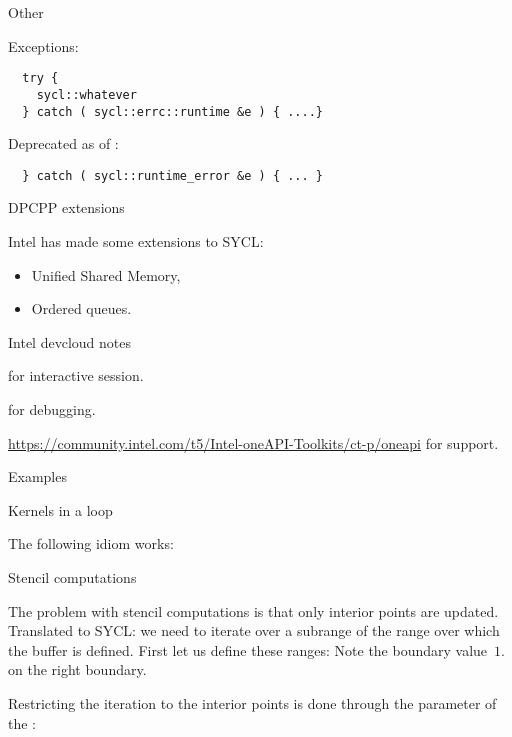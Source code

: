  {Other}

Exceptions:
\begin{lstlisting}
  try {
    sycl::whatever
  } catch ( sycl::errc::runtime &e ) { ....}
\end{lstlisting}
Deprecated as of :
\begin{lstlisting}
  } catch ( sycl::runtime_error &e ) { ... }
\end{lstlisting}

 {DPCPP extensions}

Intel has made some extensions to SYCL:
\begin{itemize}
\item Unified Shared Memory,
\item Ordered queues.
\end{itemize}

 {Intel devcloud notes}

 for interactive session.

 for debugging.

\url{https://community.intel.com/t5/Intel-oneAPI-Toolkits/ct-p/oneapi}
for support.

 {Examples}

 {Kernels in a loop}

The following idiom works:
%

 {Stencil computations}

The problem with stencil computations is that only interior points are updated.
Translated to SYCL: we need to iterate over a subrange of the range over which
the buffer is defined. First let us define these ranges:
%
%
Note the boundary value~$1.$ on the right boundary.

Restricting the iteration to the interior points is done through
the  parameter of the :
%
